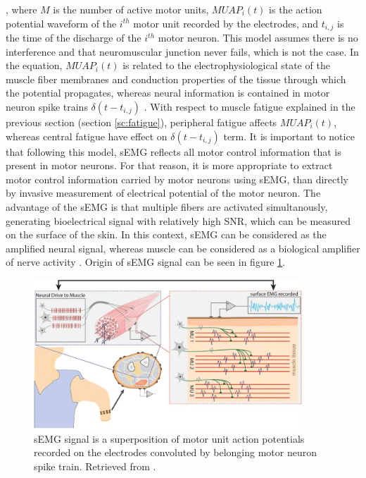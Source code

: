 , where $M$ is the number of active motor units, $MUAP_i(t)$ is the action potential waveform of the $i^{th}$ motor unit recorded by the electrodes, and $t_{i,j}$ is the time of the discharge of the $i^{th}$ motor neuron. This model assumes there is no interference and that neuromuscular junction never fails, which is not the case. In the equation, $MUAP_i(t)$ is related to the electrophysiological state of the muscle fiber membranes and conduction properties of the tissue through which the potential propagates, whereas neural information is contained in motor neuron spike trains $\delta(t-t_{i,j})$ \citep{Farina2014b}. With respect to muscle fatigue explained in the previous section (section \ref{sc:fatigue}), peripheral fatigue affects $MUAP_i(t)$, whereas central fatigue have effect on $\delta(t-t_{i,j})$ term. It is important to notice that following this model, sEMG reflects all motor control information that is present in motor neurons. For that reason, it is more appropriate to extract motor control information carried by motor neurons using sEMG, than directly by invasive measurement of electrical potential of the motor neuron. The advantage of the sEMG is that multiple fibers are activated simultanously, generating bioelectrical signal with relatively high SNR, which can be measured on the surface of the skin. In this context, sEMG can be considered as the amplified neural signal, whereas muscle can be considered as a biological amplifier of nerve activity \citep{Farina2014}. Origin of sEMG signal can be seen in figure \ref{fig:EMG_origin}.
\begin{figure}[ht]
\centering
\includegraphics[width=0.90\textwidth]{Images/introduction/EMG_origin.png}
\caption{sEMG signal is a superposition of motor unit action potentials recorded on the electrodes convoluted by belonging motor neuron spike train. Retrieved from \citet{Farina2014}.}
\label{fig:EMG_origin}
\end{figure}

